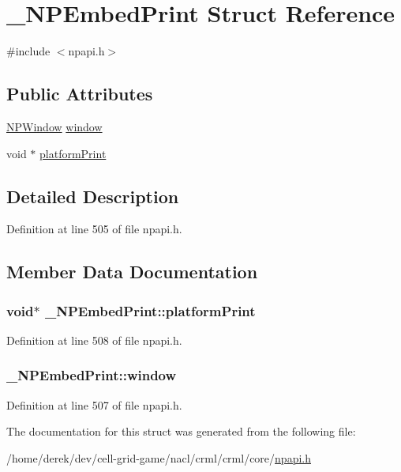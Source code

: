 \hypertarget{struct___n_p_embed_print}{
\section{\_\-NPEmbedPrint Struct Reference}
\label{struct___n_p_embed_print}
}


{\ttfamily \#include $<$npapi.h$>$}

\subsection*{Public Attributes}
\begin{DoxyCompactItemize}
\item 
\hyperlink{struct___n_p_window}{NPWindow} \hyperlink{struct___n_p_embed_print_a875099b1a13499d56ae6c84ade550a94}{window}
\item 
void $\ast$ \hyperlink{struct___n_p_embed_print_a147fecd7cac88b8873814bc493241b6e}{platformPrint}
\end{DoxyCompactItemize}


\subsection{Detailed Description}


Definition at line 505 of file npapi.h.



\subsection{Member Data Documentation}
\hypertarget{struct___n_p_embed_print_a147fecd7cac88b8873814bc493241b6e}{
\subsubsection[{platformPrint}]{\setlength{\rightskip}{0pt plus 5cm}void$\ast$ {\bf \_\-NPEmbedPrint::platformPrint}}}
\label{struct___n_p_embed_print_a147fecd7cac88b8873814bc493241b6e}


Definition at line 508 of file npapi.h.

\hypertarget{struct___n_p_embed_print_a875099b1a13499d56ae6c84ade550a94}{
\subsubsection[{window}]{ {\bf \_\-NPEmbedPrint::window}}}
\label{struct___n_p_embed_print_a875099b1a13499d56ae6c84ade550a94}


Definition at line 507 of file npapi.h.



The documentation for this struct was generated from the following file:\begin{DoxyCompactItemize}
\item 
/home/derek/dev/cell-\/grid-\/game/nacl/crml/crml/core/\hyperlink{npapi_8h}{npapi.h}\end{DoxyCompactItemize}
